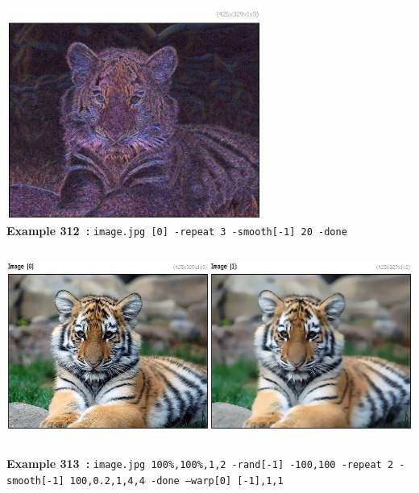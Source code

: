 \documentclass[a4paper,11pt,twoside]{book}
\begin{document}
\begin{center}\includegraphics[keepaspectratio=true,height=7cm,width=\textwidth]{img/gmic_def312.jpg}\\
{\footnotesize \textbf{Example 312~:} \texttt{image.jpg [0] -repeat 3 -smooth[-1] 20 -done}}
\\\includegraphics[keepaspectratio=true,height=7cm,width=\textwidth]{img/gmic_def313.jpg}\\
{\footnotesize \textbf{Example 313~:} \texttt{image.jpg 100\%,100\%,1,2 -rand[-1] -100,100 -repeat 2 -smooth[-1] 100,0.2,1,4,4 -done --warp[0] [-1],1,1}}
\end{center}
\end{document}
